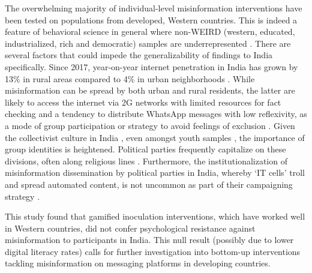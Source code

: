 \documentclass[empirical, authordate, issue]{jote-new-article}
\begin{document}
The overwhelming majority of individual-level misinformation interventions have been tested on populations from developed, Western countries. This is indeed a feature of behavioral science in general where non-WEIRD (western, educated, industrialized, rich and democratic) samples are underrepresented \parencite{Henrich2010, Rad2018}. There are several factors that could impede the generalizability of findings to India specifically. Since 2017, year-on-year internet penetration in India has grown by 13\% in rural areas compared to 4\% in urban neighborhoods \parencite{Bhattacharjee2021}. While misinformation can be spread by both urban and rural residents, the latter are likely to access the internet via 2G networks with limited resources for fact checking and a tendency to distribute \mbox{WhatsApp} messages with low reflexivity, as a mode of group participation or strategy to avoid feelings of exclusion \parencite{Banaji2019}. Given the collectivist culture in India \parencite{Kapoor2003, Verma2020}, even amongst youth samples \parencite{Rao2013}, the importance of group identities is heightened. Political parties frequently capitalize on these divisions, often along religious lines \parencite{Vaishnav2019}. Furthermore, the institutionalization of misinformation dissemination by political parties in India, whereby ‘IT cells' troll and spread automated content, is not uncommon \parencite{Campbell-Smith2019} as part of their campaigning strategy \parencite{Banaji2019}.

\begin{takeHomeMessage}

  This study found that gamified inoculation interventions, which have worked well in Western countries, did not confer psychological resistance against misinformation to participants in India. This null result (possibly due to lower digital literacy rates) calls for further investigation into bottom-up interventions tackling misinformation on messaging platforms in developing countries.
\end{takeHomeMessage}
\end{document}
